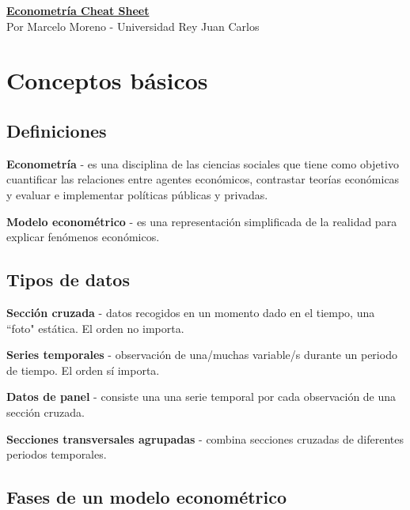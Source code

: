 \documentclass[10pt, a4paper, landscape]{extarticle}
\begin{document}
\setlength{\footskip}{12pt}
\begin{multicols}{3} %

\begin{center}
\textbf{\LARGE \href{https://github.com/marcelomijas/econometrics-cheatsheet}{Econometría Cheat Sheet}} \\ {\footnotesize Por Marcelo Moreno - Universidad Rey Juan Carlos}
\end{center}

\section*{Conceptos básicos}
\subsection*{Definiciones}

\textbf{Econometría} - es una disciplina de las ciencias sociales que tiene como objetivo cuantificar las relaciones entre agentes económicos, contrastar teorías económicas y evaluar e implementar políticas públicas y privadas.

\textbf{Modelo econométrico} - es una representación simplificada de la realidad para explicar fenómenos económicos.

\subsection*{Tipos de datos}

\textbf{Sección cruzada} - datos recogidos en un momento dado en el tiempo, una ``foto" estática. El orden no importa.

\textbf{Series temporales} - observación de una/muchas variable/s durante un periodo de tiempo. El orden sí importa.

\textbf{Datos de panel} - consiste una una serie temporal por cada observación de una sección cruzada.

\textbf{Secciones transversales agrupadas} - combina secciones cruzadas de diferentes periodos temporales.

\subsection*{Fases de un modelo econométrico}


\end{multicols}
\end{document}
